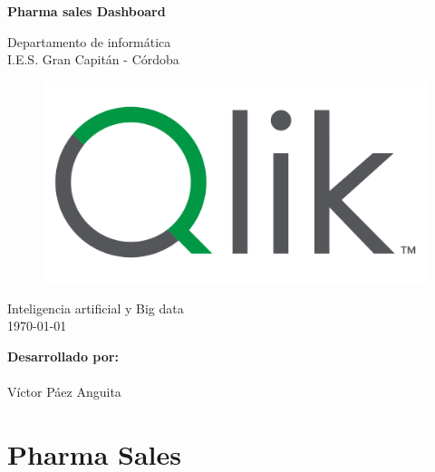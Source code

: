 \documentclass[12pt]{article}
\begin{document}
\begin{titlepage}
    \begin{center}
      \Large \bfseries{}
    \end{center}
    \vspace{0.1cm}
    \begin{center}
      \Large \bfseries{}
    \end{center}
    \vspace{0.1cm}
    \begin{center}
     \Large \bfseries{Pharma sales Dashboard}
    \end{center}
    \vspace{0.0001cm}
    \begin{center}
        Departamento de informática \\ I.E.S. Gran Capitán - Córdoba
    \end{center}
        \vspace{2 cm}
\begin{figure}[h!]
    \centering
    \includegraphics[width=.6\textwidth]{assets/portada.png}
    \label{fig:my_label}
\end{figure}
    \vspace{0.2 cm}
    \begin{center}
        Inteligencia artificial y Big data \\ \today 
    \end{center}
    \vspace{4 cm}
\null\hfill \textbf{Desarrollado por:}
\\
\\
\null\hfill Víctor Páez Anguita
\clearpage
\end{titlepage}

\tableofcontents
\clearpage


\section{Pharma Sales}
\end{document}
